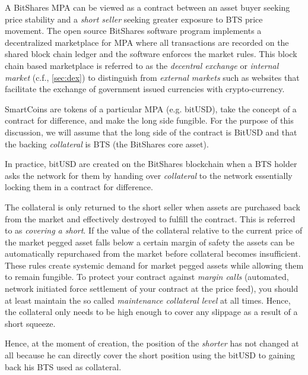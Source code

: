 \label{sec:mpa}

A BitShares MPA can be viewed as a contract between an asset buyer seeking
price stability and a \emph{short seller} seeking greater exposure to BTS price
movement. The open source BitShares software program implements a decentralized
marketplace for MPA where all transactions are recorded on the shared block
chain ledger and the software enforces the market rules. This block chain based
marketplace is referred to as the \emph{decentral exchange} or \emph{internal
market} (c.f., \cref{sec:dex}) to distinguish from \emph{external markets} such
as websites that facilitate the exchange of government issued currencies with
crypto-currency. 

SmartCoins are tokens of a particular MPA (e.g. bitUSD), take the concept of a
contract for difference, and make the long side fungible. For the purpose of
this discussion, we will assume that the long side of the contract is BitUSD
and that the backing \emph{collateral} is BTS (the BitShares core asset).

In practice, bitUSD are created on the BitShares blockchain when a BTS holder
asks the network for them by handing over \emph{collateral} to the network
essentially locking them in a contract for difference.

The collateral is only returned to the short seller when assets are purchased
back from the market and effectively destroyed to fulfill the contract. This is
referred to as \emph{covering a short}. If the value of the collateral relative
to the current price of the market pegged asset falls below a certain margin of
safety the assets can be automatically repurchased from the market before
collateral becomes insufficient. These rules create systemic demand for market
pegged assets while allowing them to remain fungible. To protect your contract
against \emph{margin calls} (automated, network initiated force settlement of
your contract at the price feed), you should at least maintain the so called
\emph{maintenance collateral level} at all times. Hence, the collateral only
needs to be high enough to cover any slippage as a result of a short squeeze.

Hence, at the moment of creation, the position of the \emph{shorter} has not
changed at all because he can directly cover the short position using the
bitUSD to gaining back his BTS used as collateral.

